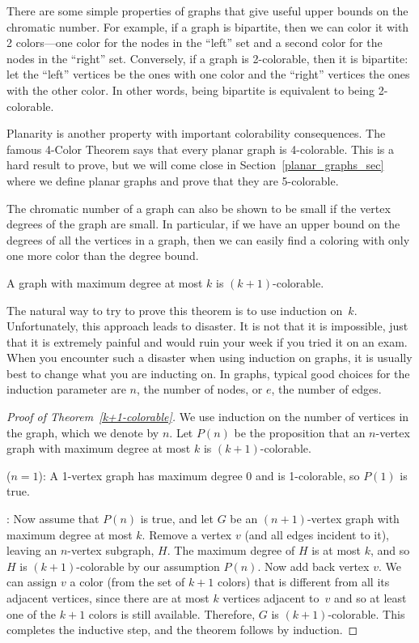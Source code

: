 There are some simple properties of graphs that give useful upper bounds
on the chromatic number.  For example, if a graph is bipartite, then we
can color it with 2 colors---one color for the nodes in the ``left'' set
and a second color for the nodes in the ``right'' set.  Conversely, if a
graph is 2-colorable, then it is bipartite: let the ``left'' vertices be
the ones with one color and the ``right'' vertices the ones with the other
color.  In other words, being bipartite is equivalent to being
2-colorable.

Planarity is another property with important colorability consequences.
The famous 4-Color Theorem says that every planar graph is 4-colorable.
This is a hard result to prove, but we will come close in
Section~\ref{planar_graphs_sec} where we define planar graphs and prove
that they are 5-colorable.

The chromatic number of a graph can also be shown to be small if the
vertex degrees of the graph are small.  In particular, if we have an
upper bound on the degrees of all the vertices in a graph, then we can
easily find a coloring with only one more color than the degree bound.

\begin{theorem}\label{k+1-colorable}
A graph with maximum degree at most $k$ is $(k+1)$-colorable.
\end{theorem}

The natural way to try to prove this theorem is to use induction
on~$k$.  Unfortunately, this approach leads to disaster.  It is not
that it is impossible, just that it is extremely painful and would
ruin your week if you tried it on an exam.  When you encounter such a
disaster when using induction on graphs, it is usually best to change
what you are inducting on.  In graphs, typical good choices for the
induction parameter are $n$, the number of nodes, or $e$, the number
of edges.

\begin{proof}[Proof of Theorem~\ref{k+1-colorable}]
We use induction on the number of vertices in the graph, which we
denote by $n$.  Let $P(n)$ be the proposition that an $n$-vertex graph
with maximum degree at most $k$ is $(k+1)$-colorable.

 ($n=1$): A 1-vertex graph has maximum degree
0 and is 1-colorable, so $P(1)$ is true.

: Now assume that $P(n)$ is true, and
let $G$ be an $(n+1)$-vertex graph with maximum degree at most $k$.
Remove a vertex $v$ (and all edges incident to it), leaving an
$n$-vertex subgraph, $H$.  The maximum degree of $H$ is at most $k$,
and so $H$ is $(k+1)$-colorable by our assumption $P(n)$.  Now add
back vertex $v$.  We can assign $v$ a color (from the set of $k + 1$
colors) that is different from all its adjacent vertices, since there
are at most $k$ vertices adjacent to~$v$ and so at least one of the
$k+1$ colors is still available.  Therefore, $G$ is $(k+1)$-colorable.
This completes the inductive step, and the theorem follows by
induction.
\end{proof}

